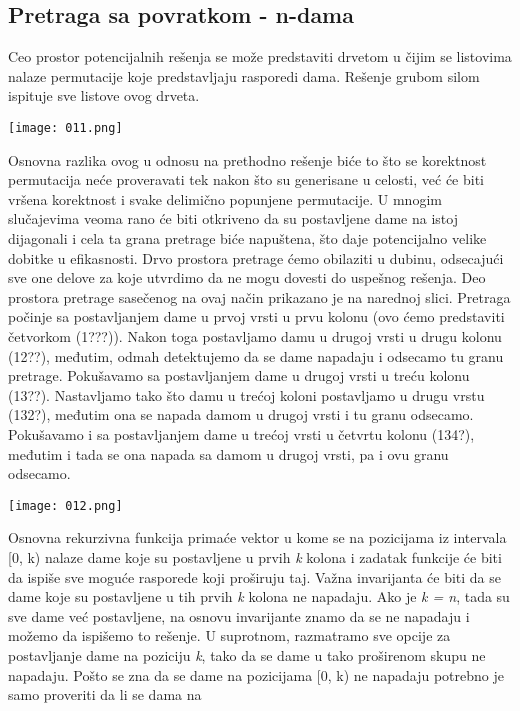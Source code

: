 \documentclass{article}
\begin{document}
\subsection{Pretraga sa povratkom - n-dama}
Ceo prostor potencijalnih rešenja se može
predstaviti drvetom u čijim se listovima nalaze permutacije koje predstavljaju
rasporedi dama. Rešenje grubom silom
ispituje sve listove ovog drveta.
\begin{center}
    \texttt{[image: 011.png]}
\end{center}
Osnovna razlika ovog u odnosu na prethodno rešenje biće to što se korektnost
permutacija neće proveravati tek nakon što su generisane u celosti, već će
biti vršena korektnost i svake delimično popunjene permutacije. U mnogim
slučajevima veoma rano će biti otkriveno da su postavljene dame na istoj
dijagonali i cela ta grana pretrage biće napuštena, što daje potencijalno velike
dobitke u efikasnosti. Drvo prostora pretrage ćemo obilaziti u dubinu, odsecajući
sve one delove za koje utvrdimo da ne mogu dovesti do uspešnog rešenja.
Deo prostora pretrage sasečenog na ovaj način prikazano je na narednoj slici. Pretraga
počinje sa postavljanjem dame u prvoj vrsti u prvu kolonu (ovo ćemo predstaviti
četvorkom (1???)). Nakon toga postavljamo damu u drugoj vrsti u drugu kolonu
(12??), međutim, odmah detektujemo da se dame napadaju i odsecamo tu granu
pretrage. Pokušavamo sa postavljanjem dame u drugoj vrsti u treću kolonu
(13??). Nastavljamo tako što damu u trećoj koloni postavljamo u drugu vrstu
(132?), međutim ona se napada damom u drugoj vrsti i tu granu odsecamo.
Pokušavamo i sa postavljanjem dame u trećoj vrsti u četvrtu kolonu (134?),
međutim i tada se ona napada sa damom u drugoj vrsti, pa i ovu granu odsecamo.
\begin{center}
    \texttt{[image: 012.png]}
\end{center}
Osnovna rekurzivna funkcija primaće vektor u
kome se na pozicijama iz intervala [0, k) nalaze dame koje su postavljene u prvih
\textit{k} kolona i zadatak funkcije će biti da ispiše sve moguće rasporede koji proširuju
taj. Važna invarijanta će biti da se
dame koje su postavljene u tih prvih \textit{k} kolona ne napadaju. Ako je 
\textit{k = n}, tada
su sve dame već postavljene, na osnovu invarijante znamo da se ne napadaju
i možemo da ispišemo to rešenje. U
suprotnom, razmatramo sve opcije za postavljanje dame na poziciju \textit{k}, tako
da se dame u tako proširenom skupu ne napadaju. Pošto se zna da se dame
na pozicijama [0, k) ne napadaju potrebno je samo proveriti da li se dama na
\end{document}
